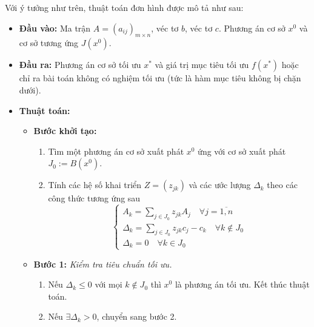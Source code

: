 Với ý tưởng như trên, thuật toán đơn hình được mô tả như sau:

\begin{itemize}
\item {\bf Đầu vào: } Ma trận $A=(a_{ij})_{m\times n}$, véc tơ $b$, véc tơ $c$. Phương án cơ sở $x^0$ và cơ sở tương ứng $J(x^0)$. 
\item {\bf Đầu ra: } Phương án cơ sở tối ưu $x^{*}$ và giá trị mục tiêu tối ưu $f(x^{*})$ hoặc chỉ ra bài toán không có nghiệm tối ưu (tức là hàm mục tiêu không bị chặn dưới).
\item {\bf Thuật toán:}
\begin{itemize}
\item[]{\bf Bước khởi tạo:} 
\begin{enumerate}
\item Tìm một phương án cơ sở xuất phát $x^0$ ứng với cơ sở xuất phát $J_0:=B(x^0)$.
\item Tính các hệ số khai triển $Z=(z_{jk})$ và các ước lượng $\Delta_k$ theo các công thức tương ứng sau
$$
\begin{cases}
A_k = \sum_{j\in J_0}z_{jk}A_j\quad \forall j=\overline{1, n}\\
\Delta_k = \sum_{j\in J_0}z_{jk}c_j - c_k\quad \forall k\notin J_0\\
\Delta_k = 0\quad \forall k\in J_0
\end{cases}
$$
\end{enumerate}

\item[]{\bf Bước 1: } {\it Kiểm tra tiêu chuẩn tối ưu.}
\begin{enumerate}
\item Nếu $\Delta_k\leq 0$ với mọi $k\notin J_0$ thì $x^0$ là phương án tối ưu. Kết thúc thuật toán.
\item Nếu $\exists\Delta_k > 0$, chuyển sang bước 2.
\end{enumerate}


\end{itemize}
\end{itemize}
